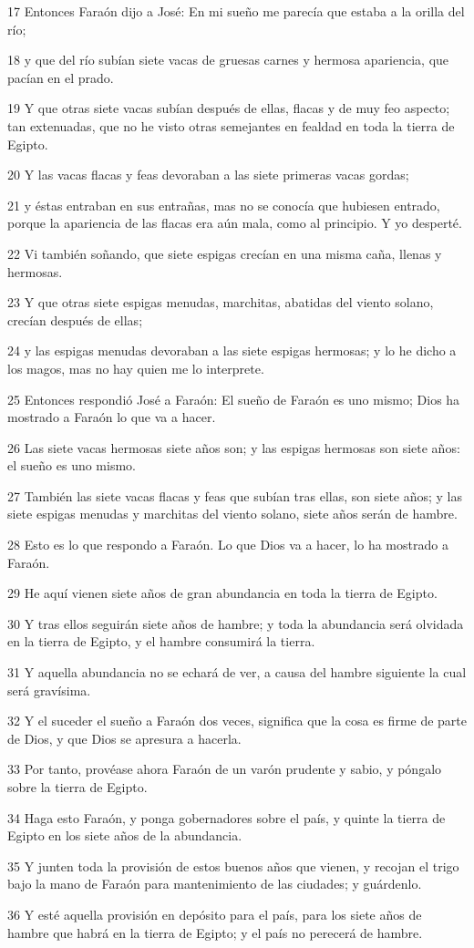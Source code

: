 \par 17 Entonces Faraón dijo a José: En mi sueño me parecía que estaba a la orilla del río;
\par 18 y que del río subían siete vacas de gruesas carnes y hermosa apariencia, que pacían en el prado.
\par 19 Y que otras siete vacas subían después de ellas, flacas y de muy feo aspecto; tan extenuadas, que no he visto otras semejantes en fealdad en toda la tierra de Egipto.
\par 20 Y las vacas flacas y feas devoraban a las siete primeras vacas gordas;
\par 21 y éstas entraban en sus entrañas, mas no se conocía que hubiesen entrado, porque la apariencia de las flacas era aún mala, como al principio. Y yo desperté.
\par 22 Vi también soñando, que siete espigas crecían en una misma caña, llenas y hermosas.
\par 23 Y que otras siete espigas menudas, marchitas, abatidas del viento solano, crecían después de ellas;
\par 24 y las espigas menudas devoraban a las siete espigas hermosas; y lo he dicho a los magos, mas no hay quien me lo interprete.
\par 25 Entonces respondió José a Faraón: El sueño de Faraón es uno mismo; Dios ha mostrado a Faraón lo que va a hacer.
\par 26 Las siete vacas hermosas siete años son; y las espigas hermosas son siete años: el sueño es uno mismo.
\par 27 También las siete vacas flacas y feas que subían tras ellas, son siete años; y las siete espigas menudas y marchitas del viento solano, siete años serán de hambre.
\par 28 Esto es lo que respondo a Faraón. Lo que Dios va a hacer, lo ha mostrado a Faraón.
\par 29 He aquí vienen siete años de gran abundancia en toda la tierra de Egipto.
\par 30 Y tras ellos seguirán siete años de hambre; y toda la abundancia será olvidada en la tierra de Egipto, y el hambre consumirá la tierra.
\par 31 Y aquella abundancia no se echará de ver, a causa del hambre siguiente la cual será gravísima.
\par 32 Y el suceder el sueño a Faraón dos veces, significa que la cosa es firme de parte de Dios, y que Dios se apresura a hacerla.
\par 33 Por tanto, provéase ahora Faraón de un varón prudente y sabio, y póngalo sobre la tierra de Egipto.
\par 34 Haga esto Faraón, y ponga gobernadores sobre el país, y quinte la tierra de Egipto en los siete años de la abundancia.
\par 35 Y junten toda la provisión de estos buenos años que vienen, y recojan el trigo bajo la mano de Faraón para mantenimiento de las ciudades; y guárdenlo.
\par 36 Y esté aquella provisión en depósito para el país, para los siete años de hambre que habrá en la tierra de Egipto; y el país no perecerá de hambre.

